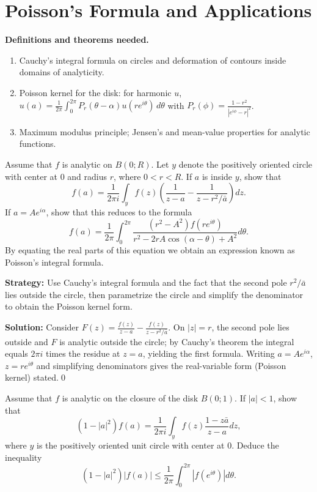 \section{Poisson's Formula and Applications}

\noindent\textbf{Definitions and theorems needed.}
\begin{enumerate}[label=(\alph*)]
\item Cauchy's integral formula on circles and deformation of contours inside domains of analyticity.
\item Poisson kernel for the disk: for harmonic $u$, $u(a)=\frac{1}{2\pi}\int_0^{2\pi} P_r(\theta-\alpha)u(re^{i\theta})\,d\theta$ with $P_r(\phi)=\frac{1-r^2}{|e^{i\phi}-r|^2}$.
\item Maximum modulus principle; Jensen's and mean-value properties for analytic functions.
\end{enumerate}



\begin{problembox}
Assume that \( f \) is analytic on \( B(0; R) \). Let \( y \) denote the positively oriented circle with center at 0 and radius \( r \), where \( 0 < r < R \). If \( a \) is inside \( y \), show that
\[f(a) = \frac{1}{2\pi i} \int_{y} f(z) \left( \frac{1}{z - a} - \frac{1}{z - r^2 / \bar{a}} \right) dz.\]
If \( a = Ae^{i\alpha} \), show that this reduces to the formula
\[f(a) = \frac{1}{2\pi} \int_0^{2\pi} \frac{(r^2 - A^2)f(re^{i\theta})}{r^2 - 2rA \cos (\alpha - \theta) + A^2} d\theta.\]
By equating the real parts of this equation we obtain an expression known as Poisson's integral formula.
\end{problembox}

\noindent\textbf{Strategy:} Use Cauchy's integral formula and the fact that the second pole \( r^2/\bar{a} \) lies outside the circle, then parametrize the circle and simplify the denominator to obtain the Poisson kernel form.

\bigskip\noindent\textbf{Solution:}
Consider $F(z)=\frac{f(z)}{z-a}-\frac{f(z)}{z-r^2/\bar a}$. On $|z|=r$, the second pole lies outside and $F$ is analytic outside the circle; by Cauchy's theorem the integral equals $2\pi i$ times the residue at $z=a$, yielding the first formula. Writing $a=Ae^{i\alpha}$, $z=re^{i\theta}$ and simplifying denominators gives the real-variable form (Poisson kernel) stated.\qed


\begin{problembox}
Assume that \( f \) is analytic on the closure of the disk \( B(0; 1) \). If \( |a| < 1 \), show that
\[(1 - |a|^2)f(a) = \frac{1}{2\pi i} \int_{y} f(z) \frac{1 - z\bar{a}}{z - a} dz,\]
where \( y \) is the positively oriented unit circle with center at 0. Deduce the inequality
\[(1 - |a|^2) |f(a)| \leq \frac{1}{2\pi} \int_0^{2\pi} |f(e^{i\theta})| d\theta.\]
\end{problembox}

